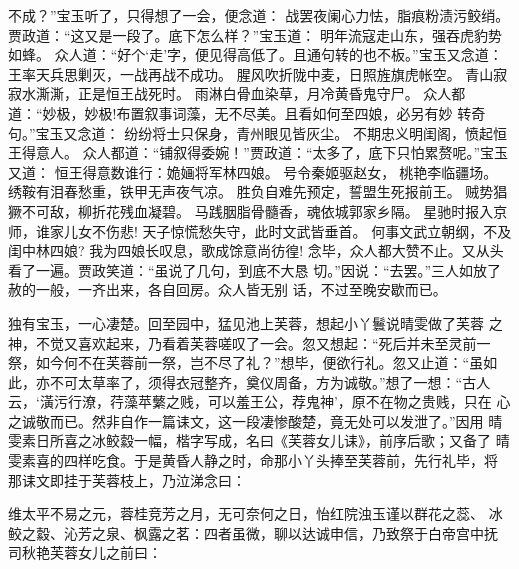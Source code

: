 不成？”宝玉听了，只得想了一会，便念道：
战罢夜阑心力怯，脂痕粉渍污鲛绡。
贾政道：“这又是一段了。底下怎么样？”宝玉道：
明年流寇走山东，强吞虎豹势如蜂。
众人道：“好个‘走’字，便见得高低了。且通句转的也不板。”宝玉又念道：
王率天兵思剿灭，一战再战不成功。
腥风吹折陇中麦，日照旌旗虎帐空。
青山寂寂水澌澌，正是恒王战死时。
雨淋白骨血染草，月冷黄昏鬼守尸。
众人都道：“妙极，妙极!布置叙事词藻，无不尽美。且看如何至四娘，必另有妙
转奇句。”宝玉又念道：
纷纷将士只保身，青州眼见皆灰尘。
不期忠义明闺阁，愤起恒王得意人。
众人都道：“铺叙得委婉！”贾政道：“太多了，底下只怕累赘呢。”宝玉又道：
恒王得意数谁行：姽婳将军林四娘。
号令秦姬驱赵女，桃艳李临疆场。
绣鞍有泪春愁重，铁甲无声夜气凉。
胜负自难先预定，誓盟生死报前王。
贼势猖獗不可敌，柳折花残血凝碧。
马践胭脂骨髓香，魂依城郭家乡隔。
星驰时报入京师，谁家儿女不伤悲!
天子惊慌愁失守，此时文武皆垂首。
何事文武立朝纲，不及闺中林四娘?
我为四娘长叹息，歌成馀意尚彷徨!
念毕，众人都大赞不止。又从头看了一遍。贾政笑道：“虽说了几句，到底不大恳
切。”因说：“去罢。”三人如放了赦的一般，一齐出来，各自回房。众人皆无别
话，不过至晚安歇而已。

独有宝玉，一心凄楚。回至园中，猛见池上芙蓉，想起小丫鬟说晴雯做了芙蓉
之神，不觉又喜欢起来，乃看着芙蓉嗟叹了一会。忽又想起：“死后并未至灵前一
祭，如今何不在芙蓉前一祭，岂不尽了礼？”想毕，便欲行礼。忽又止道：“虽如
此，亦不可太草率了，须得衣冠整齐，奠仪周备，方为诚敬。”想了一想：“古人
云，‘潢污行潦，荇藻苹蘩之贱，可以羞王公，荐鬼神’，原不在物之贵贱，只在
心之诚敬而已。然非自作一篇诔文，这一段凄惨酸楚，竟无处可以发泄了。”因用
晴雯素日所喜之冰鲛縠一幅，楷字写成，名曰《芙蓉女儿诔》，前序后歌；又备了
晴雯素喜的四样吃食。于是黄昏人静之时，命那小丫头捧至芙蓉前，先行礼毕，将
那诔文即挂于芙蓉枝上，乃泣涕念曰：

维太平不易之元，蓉桂竞芳之月，无可奈何之日，怡红院浊玉谨以群花之蕊、
冰鲛之縠、沁芳之泉、枫露之茗：四者虽微，聊以达诚申信，乃致祭于白帝宫中抚
司秋艳芙蓉女儿之前曰：

